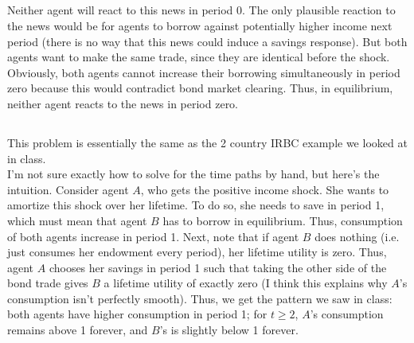 \documentclass[12pt]{article}
\begin{document}
\subsection{}
Neither agent will react to this news in period 0. The only plausible reaction to the news would be for agents to borrow against potentially higher income next period (there is no way that this news could induce a savings response). But both agents want to make the same trade, since they are identical before the shock. Obviously, both agents cannot increase their borrowing simultaneously in period zero because this would contradict bond market clearing. Thus, in equilibrium, neither agent reacts to the news in period zero.

\subsection{}
This problem is essentially the same as the 2 country IRBC example we looked at in class.\\ 

I'm not sure exactly how to solve for the time paths by hand, but here's the intuition. Consider agent $A$, who gets the positive income shock. She wants to amortize this shock over her lifetime. To do so, she needs to save in period 1, which must mean that agent $B$ has to borrow in equilibrium. Thus, consumption of both agents increase in period 1. Next, note that if agent $B$ does nothing (i.e. just consumes her endowment every period), her lifetime utility is zero. Thus, agent $A$ chooses her savings in period 1 such that taking the other side of the bond trade gives $B$ a lifetime utility of exactly zero (I think this explains why $A$'s consumption isn't perfectly smooth). Thus, we get the pattern we saw in class: both agents have higher consumption in period 1; for $t\geq 2$, $A$'s consumption remains above 1 forever, and $B$'s is slightly below 1 forever. 
\end{document}
